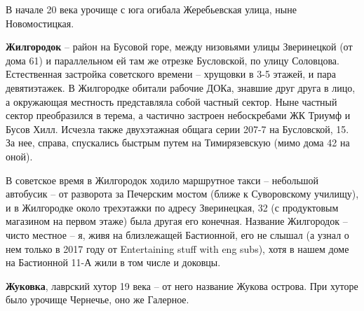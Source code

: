 В начале 20 века урочище с юга огибала Жеребьевская улица, ныне Новомостицкая.\\

\medskip

\textbf{Жилгородок} – район на Бусовой горе, между низовьями улицы Зверинецкой (от дома 61) и параллельном ей там же отрезке Бусловской, по улицу Соловцова. Естественная застройка советского времени – хрущовки в 3-5 этажей, и пара девятиэтажек. В Жилгородке обитали рабочие ДОКа, знавшие друг друга в лицо, а окружающая местность представляла собой частный сектор. Ныне частный сектор преобразился в терема, а частично застроен небоскребами ЖК Триумф и Бусов Хилл. Исчезла также двухэтажная общага серии 207-7 на Бусловской, 15. За нее, справа, спускались быстрым путем на Тимирязевскую (мимо дома 42 на оной).

В советское время в Жилгородок ходило ма\-ршрутное такси – небольшой автобусик – от разворота за Печерским мостом (ближе к Суворовскому училищу), и в Жилгородке около трехэтажки по адресу Зверинецкая, 32 (с продуктовым магазином на первом этаже) была другая его конечная. Название Жилгородок – чисто местное – я, живя на близлежащей Бастионной, его не слышал (а узнал о нем только в 2017 году от Entertaining stuff with eng subs), хотя в нашем доме на Бастионной 11-А жили в том числе и доковцы.\\

\medskip

\textbf{Жуковка}, лаврский хутор 19 века – от него название Жукова острова. При хуторе было урочище Чернечье, оно же Галерное.\\
